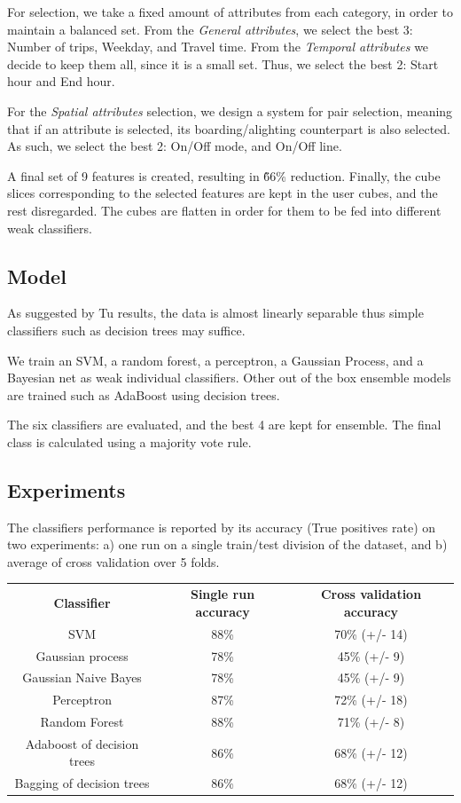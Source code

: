 \documentclass{article}
\begin{document}
For selection, we take a fixed amount of attributes from each category, in order to maintain a balanced set. From the \textit{General attributes}, we select the best 3: Number of trips, Weekday, and Travel time. From the \textit{Temporal attributes} we decide to keep them all, since it is a small set. Thus, we select the best 2: Start hour and End hour. 

For the \textit{Spatial attributes} selection, we design a system for pair selection, meaning that if an attribute is selected, its boarding/alighting counterpart is also selected. As such, we select the best 2: On/Off mode, and On/Off line. 

A final set of 9 features is created, resulting in \~66\% reduction. Finally, the cube slices corresponding to the selected features are kept in the user cubes, and the rest disregarded. The cubes are flatten in order for them to be fed into different weak classifiers. 

\subsection{Model}
As suggested by Tu \cite{tu2016impact} results, the data is almost linearly separable thus simple classifiers such as decision trees may suffice.

We train an SVM, a random forest, a perceptron, a Gaussian Process, and a Bayesian net as weak individual classifiers. Other out of the box ensemble models are trained such as AdaBoost using decision trees. 
 
The six classifiers are evaluated, and the best 4 are kept for ensemble. The final class is calculated using a majority vote rule. 


\subsection{Experiments}
The classifiers performance is reported by its accuracy (True positives rate) on two experiments: a) one run on a single train/test division of the dataset, and b) average of cross validation over 5 folds. 

\begin{tabular}{|c|c|c|}
\textbf{Classifier} & \textbf{Single run accuracy} & \textbf{Cross validation accuracy} \\
SVM & 88\% & 70\% (+/- 14)\\
Gaussian process & 78\% & 45\% (+/- 9)\\
Gaussian Naive Bayes & 78\% & 45\% (+/- 9)\\
Perceptron & 87\% & 72\% (+/- 18)\\
Random Forest & 88\% & 71\% (+/- 8)\\
Adaboost of decision trees & 86\% & 68\% (+/- 12)\\
Bagging of decision trees & 86\% & 68\% (+/- 12)\\
\end{tabular}
\end{document}
